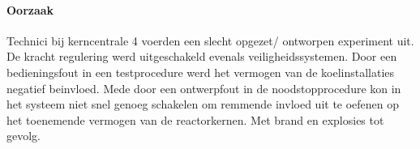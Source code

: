 \documentclass{article}
\begin{document}
	\paragraph{Oorzaak}
	\newline \indent
	
	Technici bij kerncentrale 4 voerden een slecht opgezet/ ontworpen experiment uit. De  kracht regulering werd uitgeschakeld evenals veiligheidssystemen. 
	Door een bedieningsfout in een testprocedure werd het vermogen van de koelinstallaties negatief beinvloed. Mede door een ontwerpfout in de noodstopprocedure kon in het systeem niet snel genoeg schakelen om remmende invloed uit te oefenen op het toenemende vermogen van de reactorkernen. Met brand en explosies tot gevolg.
	\cite{rivmTjernobyl}
	\cite{andereTijdenTjernobyl}
	\cite{kingskey19042022tjernobyl}
	\cite{erikbork26042023reactor4}
	\cite{nosTjernobyl30jaarlater}
\end{document}
